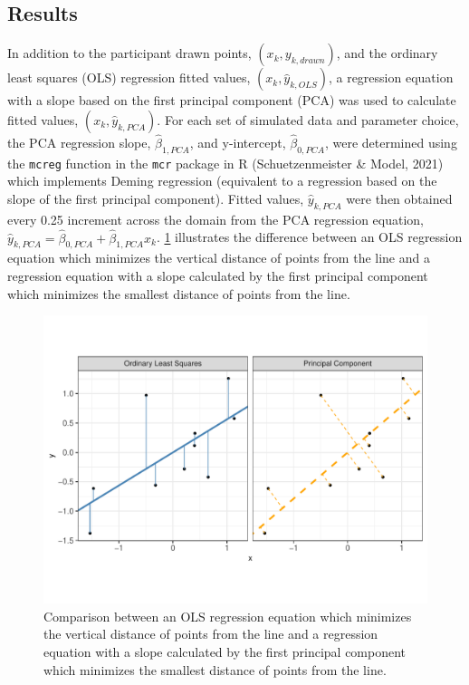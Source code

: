 \documentclass[print]{nuthesis}
\begin{document}
\hypertarget{results-1}{%
\subsection{Results}\label{results-1}}

In addition to the participant drawn points, \((x_k, y_{k,drawn})\), and the ordinary least squares (OLS) regression fitted values, \((x_k, \hat y_{k,OLS})\), a regression equation with a slope based on the first principal component (PCA) was used to calculate fitted values, \((x_k, \hat y_{k,PCA})\).
For each set of simulated data and parameter choice, the PCA regression slope, \(\hat\beta_{1,PCA}\), and y-intercept, \(\hat\beta_{0,PCA}\), were determined using the \texttt{mcreg} function in the \texttt{mcr} package in R (Schuetzenmeister \& Model, 2021) which implements Deming regression (equivalent to a regression based on the slope of the first principal component).
Fitted values, \(\hat y_{k,PCA}\) were then obtained every 0.25 increment across the domain from the PCA regression equation, \(\hat y_{k,PCA} = \hat\beta_{0,PCA} + \hat\beta_{1,PCA} x_k\).
\cref{fig:ols-vs-pca-example} illustrates the difference between an OLS regression equation which minimizes the vertical distance of points from the line and a regression equation with a slope calculated by the first principal component which minimizes the smallest distance of points from the line.

\begin{figure}[tbp]

{\centering \includegraphics[width=1\linewidth,]{thesis_files/figure-latex/ols-vs-pca-example-1} 

}

\caption[OLS vs PCA regression lines]{Comparison between an OLS regression equation which minimizes the vertical distance of points from the line and a regression equation with a slope calculated by the first principal component which minimizes the smallest distance of points from the line.}\label{fig:ols-vs-pca-example}
\end{figure}
\end{document}
